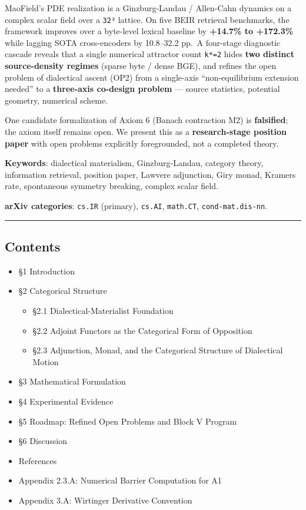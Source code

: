 \documentclass[
]{article}
\providecommand{\tightlist}{%
  \setlength{\itemsep}{0pt}\setlength{\parskip}{0pt}}
\begin{document}
MaoField's PDE realization is a Ginzburg-Landau / Allen-Cahn dynamics on
a complex scalar field over a \texttt{32³} lattice. On five BEIR
retrieval benchmarks, the framework improves over a byte-level lexical
baseline by \textbf{+14.7\% to +172.3\%} while lagging SOTA
cross-encoders by 10.8--32.2 pp.~A four-stage diagnostic cascade reveals
that a single numerical attractor count \texttt{k*=2} hides \textbf{two
distinct source-density regimes} (sparse byte / dense BGE), and refines
the open problem of dialectical ascent (OP2) from a single-axis
``non-equilibrium extension needed'' to a \textbf{three-axis co-design
problem} --- source statistics, potential geometry, numerical scheme.

One candidate formalization of Axiom 6 (Banach contraction M2) is
\textbf{falsified}; the axiom itself remains open. We present this as a
\textbf{research-stage position paper} with open problems explicitly
foregrounded, not a completed theory.

\textbf{Keywords}: dialectical materialism, Ginzburg-Landau, category
theory, information retrieval, position paper, Lawvere adjunction, Giry
monad, Kramers rate, spontaneous symmetry breaking, complex scalar
field.

\textbf{arXiv categories}: \texttt{cs.IR} (primary), \texttt{cs.AI},
\texttt{math.CT}, \texttt{cond-mat.dis-nn}.

\begin{center}\rule{0.5\linewidth}{0.5pt}\end{center}

\hypertarget{contents}{%
\subsection{Contents}\label{contents}}

\begin{itemize}
\tightlist
\item
  §1 Introduction
\item
  §2 Categorical Structure

  \begin{itemize}
  \tightlist
  \item
    §2.1 Dialectical-Materialist Foundation
  \item
    §2.2 Adjoint Functors as the Categorical Form of Opposition
  \item
    §2.3 Adjunction, Monad, and the Categorical Structure of Dialectical
    Motion
  \end{itemize}
\item
  §3 Mathematical Formulation
\item
  §4 Experimental Evidence
\item
  §5 Roadmap: Refined Open Problems and Block V Program
\item
  §6 Discussion
\item
  References
\item
  Appendix 2.3.A: Numerical Barrier Computation for A1
\item
  Appendix 3.A: Wirtinger Derivative Convention
\end{itemize}
\end{document}

